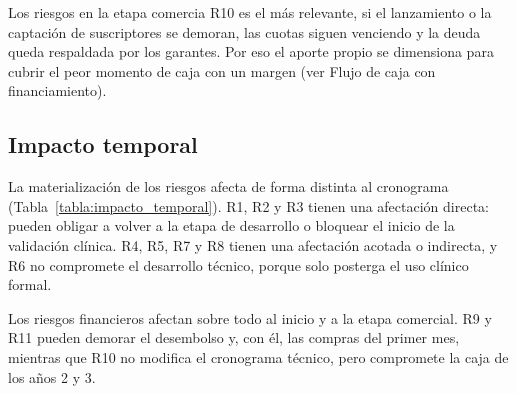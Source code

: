     Los riesgos en la etapa comercia R10 es el más relevante, si el lanzamiento o la captación de suscriptores se demoran, las cuotas siguen venciendo y la deuda queda respaldada por los garantes. Por eso el aporte propio se dimensiona para cubrir el peor momento de caja con un margen (ver Flujo de caja con financiamiento).

    \subsection{Impacto temporal}

        La materialización de los riesgos afecta de forma distinta al cronograma (Tabla~\ref{tabla:impacto_temporal}). R1, R2 y R3 tienen una afectación directa: pueden obligar a volver a la etapa de desarrollo o bloquear el inicio de la validación clínica. R4, R5, R7 y R8 tienen una afectación acotada o indirecta, y R6 no compromete el desarrollo técnico, porque solo posterga el uso clínico formal.

        Los riesgos financieros afectan sobre todo al inicio y a la etapa comercial. R9 y R11 pueden demorar el desembolso y, con él, las compras del primer mes, mientras que R10 no modifica el cronograma técnico, pero compromete la caja de los años 2 y 3.

